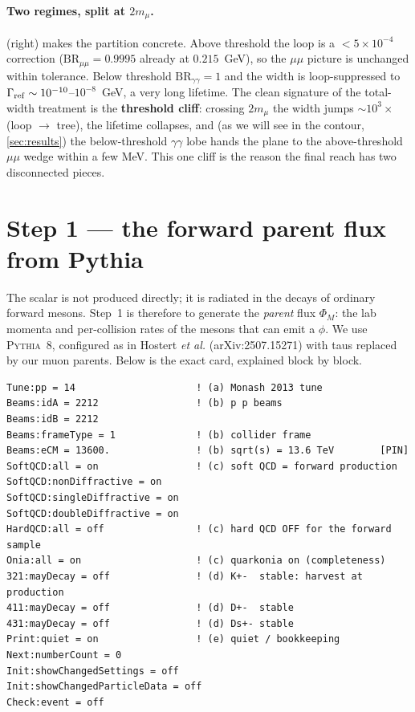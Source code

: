 \documentclass[11pt]{article}
\begin{document}
\paragraph{Two regimes, split at $2m_\mu$.}  (right) makes the
partition concrete. Above threshold the loop is a $<\!5\times10^{-4}$ correction
($\mathrm{BR}_{\mu\mu}=0.9995$ already at $0.215$~GeV), so the $\mu\mu$ picture is
unchanged within tolerance. Below threshold $\mathrm{BR}_{\gamma\gamma}=1$ and
the width is loop-suppressed to $\Gamma_{\rm ref}\sim10^{-10}$--$10^{-8}$~GeV, a
very long lifetime. The clean signature of the total-width treatment is the
\textbf{threshold cliff}: crossing $2m_\mu$ the width jumps $\sim\!10^3\times$
(loop $\to$ tree), the lifetime collapses, and (as we will see in the contour,
\cref{sec:results}) the below-threshold $\gamma\gamma$ lobe hands the plane to the
above-threshold $\mu\mu$ wedge within a few MeV. This one cliff is the reason the
final reach has two disconnected pieces.

\section{Step 1 --- the forward parent flux from Pythia}
\label{sec:pythia}

The scalar is not produced directly; it is radiated in the decays of ordinary
forward mesons. Step~1 is therefore to generate the \emph{parent} flux $\Phi_M$:
the lab momenta and per-collision rates of the mesons that can emit a $\phi$. We
use \textsc{Pythia}~8, configured as in Hostert \emph{et al.}
(arXiv:2507.15271) with taus replaced by our muon parents. Below is the exact
card, explained block by block.

\begin{lstlisting}
Tune:pp = 14                     ! (a) Monash 2013 tune
Beams:idA = 2212                 ! (b) p p beams
Beams:idB = 2212
Beams:frameType = 1              ! (b) collider frame
Beams:eCM = 13600.               ! (b) sqrt(s) = 13.6 TeV        [PIN]
SoftQCD:all = on                 ! (c) soft QCD = forward production
SoftQCD:nonDiffractive = on
SoftQCD:singleDiffractive = on
SoftQCD:doubleDiffractive = on
HardQCD:all = off                ! (c) hard QCD OFF for the forward sample
Onia:all = on                    ! (c) quarkonia on (completeness)
321:mayDecay = off               ! (d) K+-  stable: harvest at production
411:mayDecay = off               ! (d) D+-  stable
431:mayDecay = off               ! (d) Ds+- stable
Print:quiet = on                 ! (e) quiet / bookkeeping
Next:numberCount = 0
Init:showChangedSettings = off
Init:showChangedParticleData = off
Check:event = off
\end{lstlisting}
\end{document}
